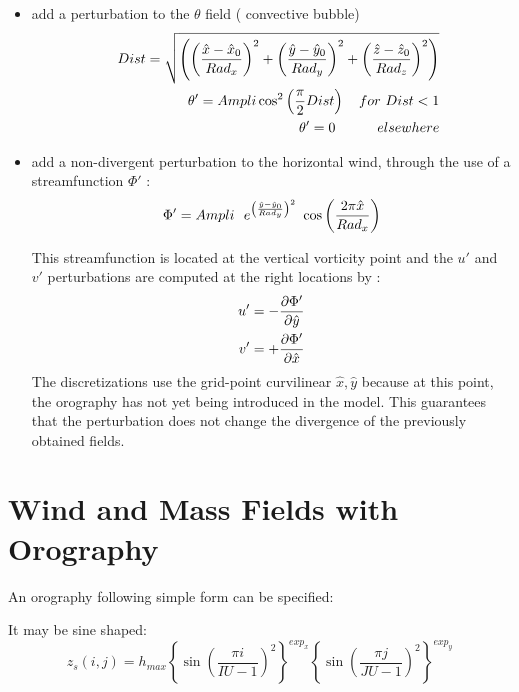 \begin{itemize}
\item
add a perturbation to the $\theta $ field ( convective bubble)
\begin{eqnarray}
&&Dist = \sqrt{ \left( \left( { \hat{x} - \hat{x}_0    \over  Rad_x } \right) ^2 +
                       \left( { \hat{y} - \hat{y}_0    \over  Rad_y } \right) ^2 +
                       \left( { \hat{z} - \hat{z}_0    \over  Rad_z } \right) ^2
                \right)       }  \nonumber \\
&&\theta ' =  Ampli \cos ^2  \left( {\pi \over 2} Dist  \right)  \ \ \
for \ Dist < 1  \nonumber \\
&&\theta ' = 0  \ \ \  \ \ \  \ \ \  elsewhere  \nonumber
\end{eqnarray}

\item
add a non-divergent perturbation to the horizontal wind, through the use of a
streamfunction $\Phi '$ :
\begin{equation}
\Phi ' = Ampli \ \  e^{\left( { \hat{y} - \hat{y}_0    \over  Rad_y } \right) ^2 }
\  \cos \left( {2 \pi  \hat{x} \over  Rad_x } \right)   \nonumber
\end{equation}

This streamfunction is located at the vertical vorticity point and the $u'$
and $v'$ perturbations are computed at the right locations by :
\begin{eqnarray}
u' = - { \partial \Phi ' \over \partial \hat{y} } \nonumber \\
v' = + { \partial \Phi ' \over \partial \hat{x} } \nonumber
\end{eqnarray}
The discretizations use the grid-point curvilinear $ \hat{x}, \hat{y}$ because
at this point, the orography has  not yet  being  introduced in  the model.
This guarantees that the perturbation does not change the  divergence of the
previously obtained fields.
\end{itemize}



\section{Wind and Mass Fields with Orography}

An orography following simple form can be specified:

It may be sine shaped:
$$
z_{s}(i,j) = h_{max} \left\{  \sin \left( \dfrac{\pi i}{IU-1}\right)^{2}
\right\}^{exp_{x}}\left\{  \sin \left( \dfrac{\pi j}{JU-1}\right)^{2}
\right\}^{exp_{y}}
$$

